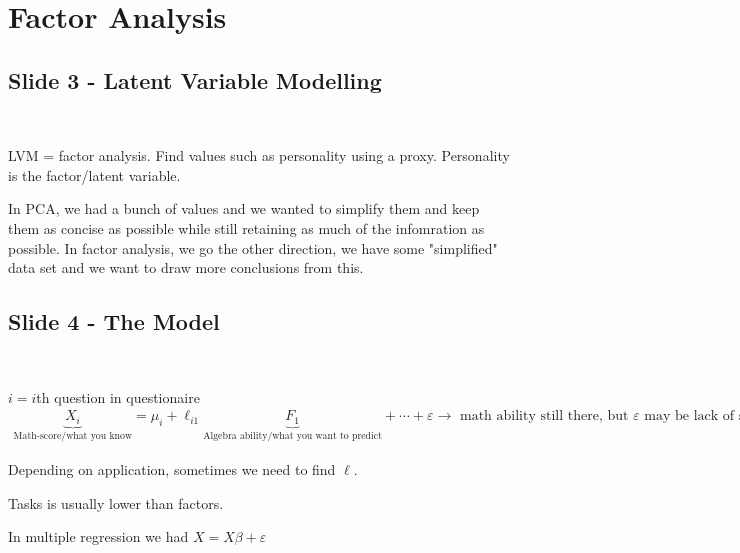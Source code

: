 \section{Factor Analysis}
\subsection{Slide 3 - Latent Variable Modelling}\hfill\\\par
\noindent LVM = factor analysis. Find values such as personality using a proxy. Personality is the factor/latent variable.
\par\bigskip
\noindent In PCA, we had a bunch of values and we wanted to simplify them and keep them as concise as possible while still retaining as much of the infomration as possible. In factor analysis, we go the other direction, we have some "simplified" data set and we want to draw more conclusions from this.
\par\bigskip
\subsection{Slide 4 - The Model}\hfill\\\par
\noindent $i = i$th question in questionaire
\begin{equation*}
  \begin{gathered}
    \underbrace{X_i}_{\text{Math-score/what you know}} = \mu_i + \ell_{i1}\underbrace{F_1}_{\text{Algebra ability/what you want to predict}}+\cdots+\varepsilon \rightarrow \text{ math ability still there, but $\varepsilon$ may be lack of sleep. If the $\varepsilon$ is convoluted, then you have not captured everything in your questionaire}
  \end{gathered}
\end{equation*}
\par\bigskip
\noindent Depending on application, sometimes we need to find $\ell$.
\par\bigskip
\noindent Tasks is usually lower than factors.
\par\bigskip
\noindent In multiple regression we had $X = X\beta + \varepsilon$
